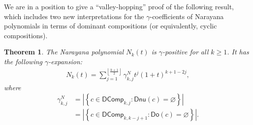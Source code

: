 \documentclass[reqno]{amsart}
\numberwithin{equation}{section}
\newtheorem{theorem}{Theorem}[section]
\theoremstyle{definition}
\theoremstyle{named}
\newcommand{\abs}[1]{\left|#1\right|}
\newcommand{\set}[1]{\left\{#1\right\}}
\def\DComp{\mathsf{DComp}}
\def\Dnu{\mathsf{Dnu}}
\def\Do{\mathsf{Do}}
\begin{document}
We are in a position to give a ``valley-hopping'' proof of the following result, which includes two new interpretations for the $\gamma$-coefficients of Narayana polynomials in terms of dominant compositions (or equivalently, cyclic compositions).
\begin{theorem}
The Narayana polynomial $N_k(t)$ is $\gamma$-positive for all $k \ge 1$. It has the following $\gamma$-expansion:
\begin{align}
N_k(t)=\sum_{j=1}^{\left \lfloor \frac{k+1}{2} \right \rfloor } \gamma^{N}_{k,j} t^j(1+t)^{k+1-2j} ,
\end{align}
where
\begin{align}
\label{gamma-inter1}
\gamma^{N}_{k,j}&=\abs{\set{c\in \DComp_{k,j} : \Dnu(c)=\varnothing}}\\
&=\abs{\set{c\in \DComp_{k,k-j+1} : \Do(c)=\varnothing}}.\label{gamma-inter2}
\end{align}
\end{theorem}
\end{document}
